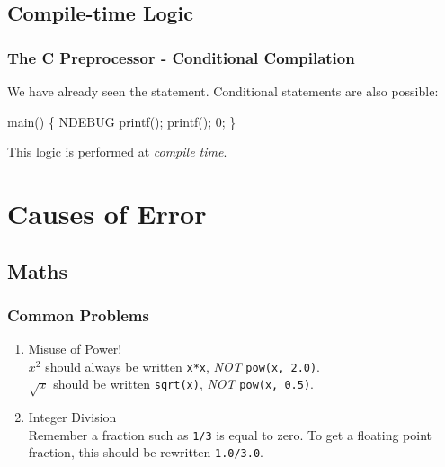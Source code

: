 \documentclass[smaller,table]{beamer} %
\begin{document}
\subsection{Compile-time Logic}
\begin{frame}[fragile]
\frametitle{The C Preprocessor - Conditional Compilation}
We have already seen the {\tt {}} statement. Conditional statements are also possible:
\vspace{-0.2in}
\begin{semiverbatim}
\small
\kr\kl{} 
\kl
\kl{} main()
\kl\{
\kl{} NDEBUG
\kl   printf();
\kl{}
\kl   printf();
\kl{}
\kl   {} 0;
\kl\}
\end{semiverbatim}
\begin{alertblock}{}
This logic is performed at \emph{compile time}.
\end{alertblock}
\end{frame}


\section{Causes of Error}

\subsection{Maths}
\begin{frame}
\frametitle{Common Problems}
\begin{enumerate}
\item Misuse of Power!\\
$x^2$ should always be written {\tt x*x}, \emph{NOT} {\tt pow(x, 2.0)}.\\
$\sqrt{x}$ should be written {\tt sqrt(x)}, \emph{NOT} {\tt pow(x, 0.5)}.
\item Integer Division\\
Remember a fraction such as {\tt 1/3} is equal to zero. To get a floating point fraction, this should be rewritten {\tt 1.0/3.0}.
\end{enumerate}
\end{frame}
\end{document}
